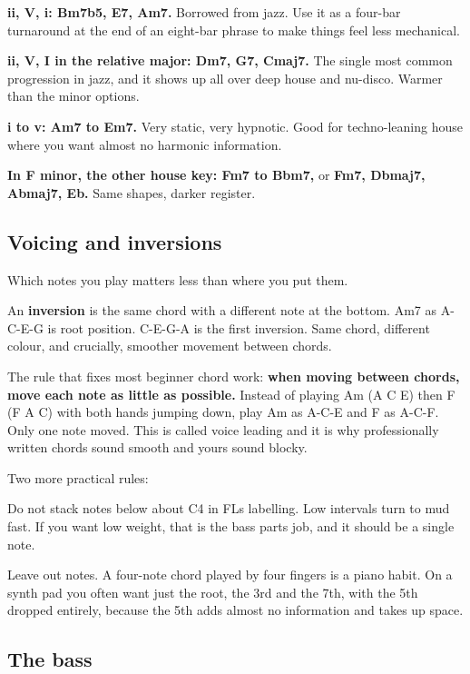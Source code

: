 \textbf{ii, V, i: Bm7b5, E7, Am7.} Borrowed from jazz. Use it as a four-bar turnaround at the end
of an eight-bar phrase to make things feel less mechanical.

\textbf{ii, V, I in the relative major: Dm7, G7, Cmaj7.} The single most common progression in
jazz, and it shows up all over deep house and nu-disco. Warmer than the minor options.

\textbf{i to v: Am7 to Em7.} Very static, very hypnotic. Good for techno-leaning house where you
want almost no harmonic information.

\textbf{In F minor, the other house key: Fm7 to Bbm7,} or \textbf{Fm7, Dbmaj7, Abmaj7, Eb.} Same
shapes, darker register.

\subsection{Voicing and inversions}\label{th04_harmony-voicing-and-inversions}

Which notes you play matters less than where you put them.

An \textbf{inversion} is the same chord with a different note at the bottom. Am7 as A-C-E-G is
root position. C-E-G-A is the first inversion. Same chord, different colour, and crucially,
smoother movement between chords.

The rule that fixes most beginner chord work: \textbf{when moving between chords, move each note
as little as possible.} Instead of playing Am (A C E) then F (F A C) with both hands
jumping down, play Am as A-C-E and F as A-C-F. Only one note moved. This is called voice
leading and it is why professionally written chords sound smooth and yours sound blocky.

Two more practical rules:

Do not stack notes below about C4 in FL\textquotesingle s labelling. Low intervals turn to mud fast. If you
want low weight, that is the bass part\textquotesingle s job, and it should be a single note.

Leave out notes. A four-note chord played by four fingers is a piano habit. On a synth pad
you often want just the root, the 3rd and the 7th, with the 5th dropped entirely, because
the 5th adds almost no information and takes up space.

\subsection{The bass}\label{th04_harmony-the-bass}

